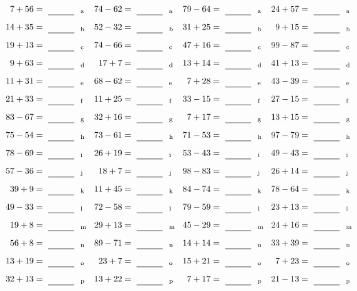 \documentclass
[
  draft    = true,
  fontsize = 11pt,
  parskip  = half-
]
{scrartcl}
\begin{document}
\clearpage
\begin{align*}
    \pline{7+56}&=\rline{a}
  & \pline{74-62}&=\rline{a}
  & \pline{79-64}&=\rline{a}
  & \pline{24+57}&=\rline{a} \\[1ex]
    \pline{14+35}&=\rline{b}
  & \pline{52-32}&=\rline{b}
  & \pline{31+25}&=\rline{b}
  & \pline{9+15}&=\rline{b} \\[1ex]
    \pline{19+13}&=\rline{c}
  & \pline{74-66}&=\rline{c}
  & \pline{47+16}&=\rline{c}
  & \pline{99-87}&=\rline{c} \\[1ex]
    \pline{9+63}&=\rline{d}
  & \pline{17+7}&=\rline{d}
  & \pline{13+14}&=\rline{d}
  & \pline{41+13}&=\rline{d} \\[1ex]
    \pline{11+31}&=\rline{e}
  & \pline{68-62}&=\rline{e}
  & \pline{7+28}&=\rline{e}
  & \pline{43-39}&=\rline{e} \\[1ex]
    \pline{21+33}&=\rline{f}
  & \pline{11+25}&=\rline{f}
  & \pline{33-15}&=\rline{f}
  & \pline{27-15}&=\rline{f} \\[1ex]
    \pline{83-67}&=\rline{g}
  & \pline{32+16}&=\rline{g}
  & \pline{7+17}&=\rline{g}
  & \pline{13+15}&=\rline{g} \\[1ex]
    \pline{75-54}&=\rline{h}
  & \pline{73-61}&=\rline{h}
  & \pline{71-53}&=\rline{h}
  & \pline{97-79}&=\rline{h} \\[1ex]
    \pline{78-69}&=\rline{i}
  & \pline{26+19}&=\rline{i}
  & \pline{53-43}&=\rline{i}
  & \pline{49-43}&=\rline{i} \\[1ex]
    \pline{57-36}&=\rline{j}
  & \pline{18+7}&=\rline{j}
  & \pline{98-83}&=\rline{j}
  & \pline{26+14}&=\rline{j} \\[1ex]
    \pline{39+9}&=\rline{k}
  & \pline{11+45}&=\rline{k}
  & \pline{84-74}&=\rline{k}
  & \pline{78-64}&=\rline{k} \\[1ex]
    \pline{49-33}&=\rline{l}
  & \pline{72-58}&=\rline{l}
  & \pline{79-59}&=\rline{l}
  & \pline{23+13}&=\rline{l} \\[1ex]
    \pline{19+8}&=\rline{m}
  & \pline{29+13}&=\rline{m}
  & \pline{45-29}&=\rline{m}
  & \pline{24+16}&=\rline{m} \\[1ex]
    \pline{56+8}&=\rline{n}
  & \pline{89-71}&=\rline{n}
  & \pline{14+14}&=\rline{n}
  & \pline{33+39}&=\rline{n} \\[1ex]
    \pline{13+19}&=\rline{o}
  & \pline{23+7}&=\rline{o}
  & \pline{15+21}&=\rline{o}
  & \pline{7+23}&=\rline{o} \\[1ex]
    \pline{32+13}&=\rline{p}
  & \pline{13+22}&=\rline{p}
  & \pline{7+17}&=\rline{p}
  & \pline{21-13}&=\rline{p}
\end{align*}
\end{document}
